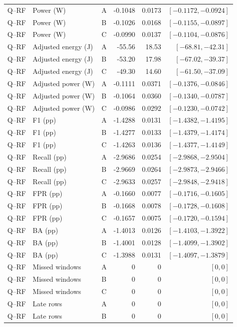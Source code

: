 \begin{longtable}{lllrrr}
Q--RF & Power (W) & A & -0.1048 & 0.0173 & $[-0.1172,-0.0924]$\\
Q--RF & Power (W) & B & -0.1026 & 0.0168 & $[-0.1155,-0.0897]$\\
Q--RF & Power (W) & C & -0.0990 & 0.0137 & $[-0.1104,-0.0876]$\\
Q--RF & Adjusted energy (J) & A & -55.56 & 18.53 & $[-68.81,-42.31]$\\
Q--RF & Adjusted energy (J) & B & -53.20 & 17.98 & $[-67.02,-39.37]$\\
Q--RF & Adjusted energy (J) & C & -49.30 & 14.60 & $[-61.50,-37.09]$\\
Q--RF & Adjusted power (W) & A & -0.1111 & 0.0371 & $[-0.1376,-0.0846]$\\
Q--RF & Adjusted power (W) & B & -0.1064 & 0.0360 & $[-0.1340,-0.0787]$\\
Q--RF & Adjusted power (W) & C & -0.0986 & 0.0292 & $[-0.1230,-0.0742]$\\
Q--RF & F1 (pp) & A & -1.4288 & 0.0131 & $[-1.4382,-1.4195]$\\
Q--RF & F1 (pp) & B & -1.4277 & 0.0133 & $[-1.4379,-1.4174]$\\
Q--RF & F1 (pp) & C & -1.4263 & 0.0136 & $[-1.4377,-1.4149]$\\
Q--RF & Recall (pp) & A & -2.9686 & 0.0254 & $[-2.9868,-2.9504]$\\
Q--RF & Recall (pp) & B & -2.9669 & 0.0264 & $[-2.9873,-2.9466]$\\
Q--RF & Recall (pp) & C & -2.9633 & 0.0257 & $[-2.9848,-2.9418]$\\
Q--RF & FPR (pp) & A & -0.1660 & 0.0077 & $[-0.1716,-0.1605]$\\
Q--RF & FPR (pp) & B & -0.1668 & 0.0078 & $[-0.1728,-0.1608]$\\
Q--RF & FPR (pp) & C & -0.1657 & 0.0075 & $[-0.1720,-0.1594]$\\
Q--RF & BA (pp) & A & -1.4013 & 0.0126 & $[-1.4103,-1.3922]$\\
Q--RF & BA (pp) & B & -1.4001 & 0.0128 & $[-1.4099,-1.3902]$\\
Q--RF & BA (pp) & C & -1.3988 & 0.0131 & $[-1.4097,-1.3879]$\\
Q--RF & Missed windows & A & 0 & 0 & $[0,0]$\\
Q--RF & Missed windows & B & 0 & 0 & $[0,0]$\\
Q--RF & Missed windows & C & 0 & 0 & $[0,0]$\\
Q--RF & Late rows & A & 0 & 0 & $[0,0]$\\
Q--RF & Late rows & B & 0 & 0 & $[0,0]$\\

\end{longtable}
